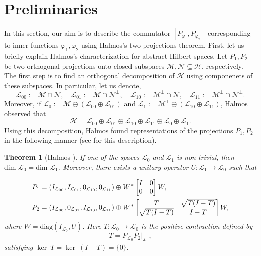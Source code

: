 \documentclass[12pt, a4 paper]{amsart}
\newcommand{\clh}{\mathcal{H}}
\newcommand{\cll}{\mathcal{L}}
\newcommand{\clm}{\mathcal{M}}
\newcommand{\cln}{\mathcal{N}}
\theoremstyle{definition}
\theoremstyle{plain}
\newtheorem{thm}{Theorem}[section]
\theoremstyle{definition}
\numberwithin{equation}{section}
\let\phi=\varphi
\begin{document}
\section{Preliminaries}\label{sec1}

In this section, our aim is to describe the commutator $[P_{\phi_1}, P_{\phi_2}]$ corresponding to inner functions $\phi_1, \phi_2$ using Halmos’s two projections theorem. First, let us briefly explain Halmos's characterization for abstract Hilbert spaces. Let $P_1,P_2$ be two orthogonal projections onto closed subspaces $\clm, \cln \subseteq \mathcal{H}$, respectively. The first step is to find an orthogonal decomposition of $\clh$ using componenets of these subspaces. In particular, let us denote,
\[
\cll_{00} :=\clm \cap \cln,\quad \cll_{01} := \clm \cap \cln^{\perp},\quad \cll_{10} :=\clm^{\perp}\cap \cln,\quad \cll_{11} :=\clm^{\perp}\cap \cln^{\perp}.
\]
Moreover, if $\cll_0:={\clm}\ominus (\cll_{00}\oplus \cll_{01})$ and $\cll_1 :={\clm}^{\perp}\ominus (\cll_{10}\oplus \cll_{11})$, Halmos observed that
\begin{equation}\label{Halmos_decomp}
 \mathcal{H}=\cll_{00}\oplus \cll_{01}\oplus \cll_{10}\oplus \cll_{11}\oplus \cll_0\oplus \cll_1.
\end{equation}
Using this decomposition, Halmos \cite[Theorem 2]{Halmos} found representations of the projections $P_1, P_2$ in the following manner (see \cite[Theorem 1.2]{BS} for this description).
\begin{thm}[Halmos \cite{Halmos}]\label{Halmos_two_subspace}
If one of the spaces $\cll_0$ and $\cll_1$ is non-trivial, then $\mbox{dim } \cll_0 = \mbox{dim } \cll_1$. Moreover, there exists a unitary operator $U:\cll_1\rightarrow \cll_0$ such that
   
    \begin{align*}
        {P_1}&=(I_{\cll_{00}},I_{\cll_{01}},0_{\cll_{10}},0_{\cll_{11}})\oplus {W}^*\begin{bmatrix}
            I & 0 \\
            0 & 0
        \end{bmatrix}{W},\notag\\
        {P_2}&=(I_{\cll_{00}},0_{\cll_{01}},I_{\cll_{10}},0_{\cll_{11}})\oplus {W}^*\begin{bmatrix}
            {T} & {\sqrt{T(I -T)}}\\
            {\sqrt{T(I - T)}} & {I -T}
        \end{bmatrix}{W},
    \end{align*}
where ${W}=\text{diag}(I_{\cll_0},{U})$.  Here ${T}:\cll_0\rightarrow \cll_0$ is the positive contraction defined by $$T=P_{{\cll_0}}P_2|_{\cll_0},$$ satisfying $\ker~T=\ker~(I-{T})=\{0\}.$
\end{thm}
\end{document}
